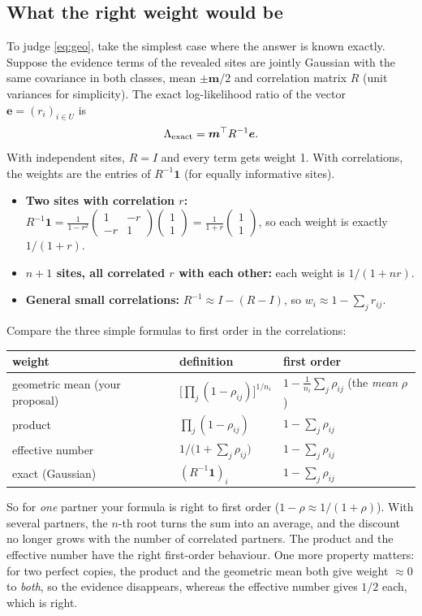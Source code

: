 \documentclass[11pt,a4paper]{article}
\begin{document}
\subsection{What the right weight would be}
To judge \eqref{eq:geo}, take the simplest case where the answer is known exactly. Suppose the evidence terms of the
revealed sites are jointly Gaussian with the same covariance in both classes, mean $\pm\bm m/2$ and correlation matrix
$R$ (unit variances for simplicity). The exact log-likelihood ratio of the vector $\bm e=(r_i)_{i\in U}$ is
\[
\Lambda_{\rm exact}=\bm m^\top R^{-1}\bm e .
\]
With independent sites, $R=I$ and every term gets weight 1. With correlations, the weights are the entries of
$R^{-1}\bm1$ (for equally informative sites).
\begin{itemize}[nosep]
\item \textbf{Two sites with correlation $r$:}
$R^{-1}\bm1=\frac{1}{1-r^2}\begin{pmatrix}1&-r\\-r&1\end{pmatrix}\begin{pmatrix}1\\1\end{pmatrix}=\frac1{1+r}\begin{pmatrix}1\\1\end{pmatrix}$,
so each weight is exactly $1/(1+r)$.
\item \textbf{$n+1$ sites, all correlated $r$ with each other:} each weight is $1/(1+nr)$.
\item \textbf{General small correlations:} $R^{-1}\approx I-(R-I)$, so $w_i\approx1-\sum_{j}r_{ij}$.
\end{itemize}
Compare the three simple formulas to first order in the correlations:
\begin{center}
\begin{tabular}{lll}
\toprule
weight & definition & first order\\
\midrule
geometric mean (your proposal) & $\big[\prod_{j}(1-\rho_{ij})\big]^{1/n_i}$ & $1-\frac1{n_i}\sum_j\rho_{ij}$ (the \emph{mean} $\rho$)\\
product & $\prod_{j}(1-\rho_{ij})$ & $1-\sum_j\rho_{ij}$\\
effective number & $1/\big(1+\sum_j\rho_{ij}\big)$ & $1-\sum_j\rho_{ij}$\\
exact (Gaussian) & $(R^{-1}\bm1)_i$ & $1-\sum_j\rho_{ij}$\\
\bottomrule
\end{tabular}
\end{center}
So for \emph{one} partner your formula is right to first order ($1-\rho\approx1/(1+\rho)$). With several partners, the
$n$-th root turns the sum into an average, and the discount no longer grows with the number of correlated partners. The
product and the effective number have the right first-order behaviour. One more property matters: for two perfect copies,
the product and the geometric mean both give weight $\approx0$ to \emph{both}, so the evidence disappears, whereas the
effective number gives $1/2$ each, which is right.
\end{document}
